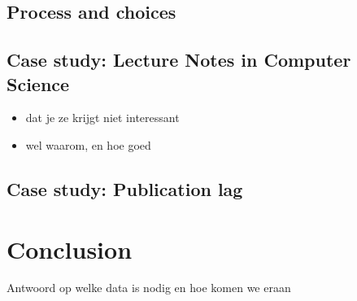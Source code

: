 \documentclass{ou-report}
\newcommand{\outline}[1]{{\color{blue} #1}}
\begin{document}
\subsection{Process and choices}
\subsection{Case study: Lecture Notes in Computer Science}
\outline{
\begin{itemize}
    \item dat je ze krijgt niet interessant
    \item wel waarom, en hoe goed
\end{itemize}
}

\subsection{Case study: Publication lag}

\section{Conclusion}
\outline{
Antwoord op welke data is nodig en hoe komen we eraan

}

\end{document}
